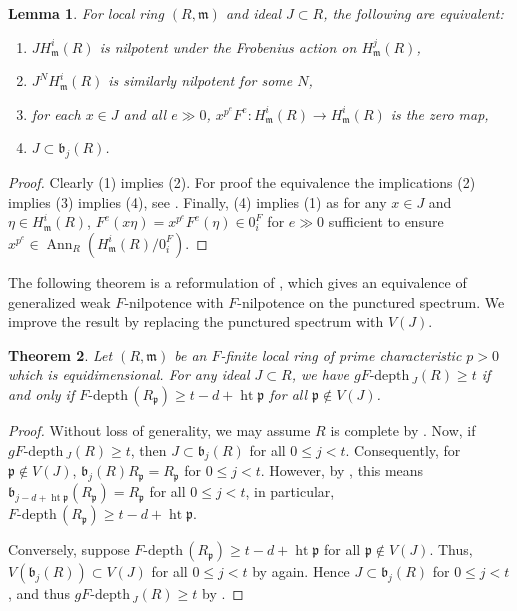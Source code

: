 \documentclass{amsproc}
\newtheorem{theorem}{Theorem}[section]
\newtheorem{lemma}[theorem]{Lemma}
\theoremstyle{definition}
\theoremstyle{remark}
\numberwithin{equation}{section}
\newcommand{\fm}{\mathfrak{m}}
\newcommand{\fb}{\mathfrak{b}}
\newcommand{\fp}{\mathfrak{p}}
\newcommand{\Ann}{\operatorname{Ann}}
\newcommand{\hgt}{\operatorname{ht}}
\newcommand{\fdp}{F\text{-depth}\,}
\newcommand{\gfdp}{gF\text{-depth}\,}
\begin{document}
\begin{lemma}\label{lem:singlej} For local ring $(R,\fm)$ and ideal $J \subset R$, the following are equivalent:
\begin{enumerate}
\item $J H^i_\fm(R)$ is nilpotent under the Frobenius action on $H^j_\fm(R)$,	
\item $J^N H^i_\fm(R)$ is similarly nilpotent for some $N$,
\item for each $x \in J$ and all $e \gg 0$, $x^{p^e}F^e : H^i_\fm(R) \to H^i_\fm(R)$ is the zero map,
\item $J \subset \fb_j(R)$. 
\end{enumerate}
\end{lemma}
\begin{proof}
Clearly (1) implies (2). For proof the equivalence the implications (2) implies (3) implies (4), see \cite[Lem. 3.2, Lem. 3.5]{CMM23}. Finally, (4) implies (1) as for any $x \in J$ and $\eta \in H^i_\fm(R)$, $F^e(x \eta) = x^{p^e}F^e(\eta) \in 0^F_i$ for $e \gg 0$ sufficient to ensure $x^{p^e} \in \Ann_R\left(H_\fm^i(R)/0^F_i\right)$.
\end{proof}

The following theorem is a reformulation of \cite[Prop. 4.6]{KMPS23}, which gives an equivalence of generalized weak $F$-nilpotence with $F$-nilpotence on the punctured spectrum. We improve the result by replacing the punctured spectrum with $V(J)$.

\begin{theorem}\label{thm:replacepuncspec}
Let $(R,\fm)$ be an $F$-finite local ring of prime characteristic $p>0$ which is equidimensional. For any ideal $J\subset R$, we have $\gfdp_J(R) \geq t$ if and only if $\fdp(R_\fp) \geq t-d+\hgt \fp$ for all $\fp \not\in V(J)$. 
\end{theorem}
\begin{proof}
Without loss of generality, we may assume $R$ is complete by \cite[Thm. 3.8]{CMM23}. Now, if $\gfdp_J(R)\ge t$, then $J \subset \fb_j(R)$ for all $0 \le j < t$. Consequently, for $\fp \not \in V(J)$, $\fb_j(R)R_\fp = R_\fp$ for $0 \le j < t$. However, by \cite[Lem. 3.9]{CMM23}, this means $\fb_{j-d+\hgt \fp}(R_\fp) = R_\fp$ for all $0 \le j < t$, in particular, $\fdp(R_\fp) \ge t-d+\hgt \fp$.

Conversely, suppose $\fdp(R_\fp) \ge t-d+\hgt\fp$ for all $\fp \not \in V(J)$. Thus, $V(\fb_j(R)) \subset V(J)$ for all $0 \le j < t$ by \cite[Lem. 3.9]{CMM23} again. Hence $J \subset \fb_j(R)$ for $0 \le j < t$, and thus $\gfdp_J(R) \ge t$ by .
\end{proof}
\end{document}
